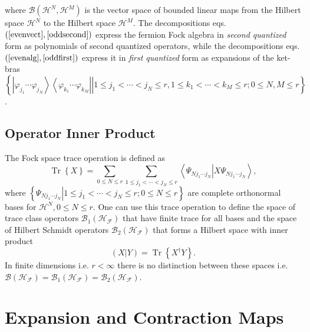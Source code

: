 \documentclass[aps,preprint]{revtex4}%
\begin{document}
where $\mathcal{B}\left(  \mathcal{H}^{N},\mathcal{H}^{M}\right)  $ is the
vector space of bounded linear maps from the Hilbert space $\mathcal{H}^{N}$
to the Hilbert space $\mathcal{H}^{M}.$ The decompositions eqs. $\left(
\ref{evenvect},\ref{oddsecond}\right)  $ express the fermion Fock algebra in
\emph{second quantized} form as polynomials of second quantized operators,
while the decompositions eqs. $\left(  \ref{evenalg},\ref{oddfirst}\right)  $
express it in \emph{first quantized} form as expansions of the ket-bras
\begin{equation}
\left\{  \left.  \left\vert \varphi_{j_{1}}\cdots\varphi_{j_{N}}\right\rangle
\left\langle \varphi_{k_{1}}\cdots\varphi_{k_{M}}\right\vert \right\vert 1\leq
j_{1}<\cdots<j_{N}\leq r,1\leq k_{1}<\cdots<k_{M}\leq r;0\leq N,M\leq
r\right\}
\end{equation}
.

\subsection{Operator Inner Product \label{Inner prod}}

The Fock space trace operation is defined as
\begin{equation}
\operatorname*{Tr}\left\{  X\right\}  =\sum_{0\leq N\leq r}\sum_{1\leq
j_{1}<\cdots<j_{N}\leq r}\left\langle \Psi_{Nj_{1}\cdots j_{N}}\left\vert
X\Psi_{Nj_{1}\cdots j_{N}}\right.  \right\rangle ,
\end{equation}
where $\left\{  \left.  \Psi_{Nj_{1}\cdots j_{N}}\right\vert 1\leq
j_{1}<\cdots<j_{N}\leq r;0\leq N\leq r\right\}  $ are complete orthonormal
bases for $\mathcal{H}^{N},0\leq N\leq r.$ One can use this trace operation to
define the space of trace class operators $\mathcal{B}_{1}\left(
\mathcal{H}_{\mathcal{F}}\right)  $ that have finite trace for all bases and
the space of Hilbert Schmidt operators $\mathcal{B}_{2}\left(  \mathcal{H}%
_{\mathcal{F}}\right)  $ that forms a Hilbert space with inner product
\begin{equation}
\left(  X\left\vert Y\right.  \right)  =\operatorname*{Tr}\left\{  X^{\dagger
}Y\right\}  .
\end{equation}
In finite dimensions i.e. $r<\infty$ there is no distinction between these
spaces i.e. $\mathcal{B}\left(  \mathcal{H}_{\mathcal{F}}\right)
=\mathcal{B}_{1}\left(  \mathcal{H}_{\mathcal{F}}\right)  =\mathcal{B}%
_{2}\left(  \mathcal{H}_{\mathcal{F}}\right)  .$

\section{Expansion and Contraction Maps \label{Expansion and Contraction}}
\end{document}
